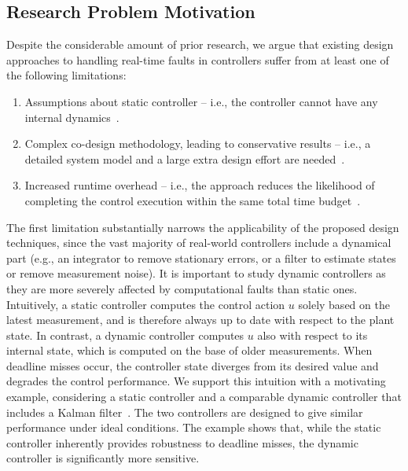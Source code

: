 \subsection{Research Problem Motivation}%
\label{sec:problem-form}%

Despite the considerable amount of prior research, we argue that existing design approaches to handling real-time faults in controllers suffer from at least one of the following limitations:
\begin{enumerate}[label=(\roman*)]
    \item Assumptions about static controller -- i.e., the controller cannot have any internal dynamics~\cite{Ramanathan:1997,Schinkel:2006,Zhang:2010,Chakraborty:2012,Chakraborty:2014,Linsenmayer:2017,Pazzaglia:2019,Maggio:2020}. 
    \item Complex co-design methodology, leading to conservative results -- i.e., a detailed system model and a large extra design effort are needed~\cite{Marti:2001,Schinkel:2006,Chakraborty:2012,Chakraborty:2014,Linsenmayer:2017,Pazzaglia:2021}.
    \item Increased runtime overhead -- i.e., the approach reduces the likelihood of completing the control execution within the same total time budget~\cite{Crespo:1999,Camacho:2010,Caccamo:2000}.
\end{enumerate}

The first limitation substantially narrows the applicability of the proposed design techniques, since the vast majority of real-world controllers include a dynamical part (e.g., an integrator to remove stationary errors, or a filter to estimate states or remove measurement noise).
It is important to study dynamic controllers as they are more severely affected by computational faults than static ones.
Intuitively, a static controller computes the control action $u$ solely based on the latest measurement, and is therefore always up to date with respect to the plant state.
In contrast, a dynamic controller computes $u$ also with respect to its internal state, which is computed on the base of older measurements.
When deadline misses occur, the controller state diverges from its desired value and degrades the control performance.
We support this intuition with a motivating example, considering a static controller and a comparable dynamic controller that includes a Kalman filter~\cite{AstWit:1984}.
The two controllers are designed to give similar performance under ideal conditions. 
The example shows that, while the static controller inherently provides robustness to deadline misses, the dynamic controller is significantly more sensitive.


